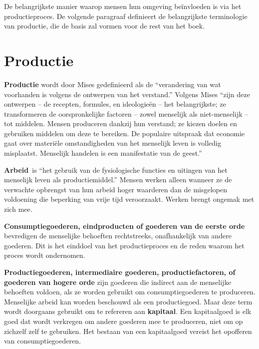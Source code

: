 De belangrijkste manier waarop mensen hun omgeving beïnvloeden is via
het productieproces. De volgende paragraaf definieert de belangrijkste
terminologie van productie, die de basis zal vormen voor de rest van het
boek.

\section{Productie}

\textbf{Productie} wordt door Mises gedefinieerd als de \enquote{verandering van
wat voorhanden is volgens de ontwerpen van het verstand.} Volgens Mises
\enquote{zijn deze ontwerpen -- de recepten, formules, en ideologieën -- het
belangrijkste; ze transformeren de oorspronkelijke factoren -- zowel
menselijk als niet-menselijk -- tot middelen. Mensen produceren dankzij
hun verstand; ze kiezen doelen en gebruiken middelen om deze te
bereiken. De populaire uitspraak dat economie gaat over materiële
omstandigheden van het menselijk leven is volledig misplaatst. Menselijk
handelen is een manifestatie van de geest.}\autocite{39}

\textbf{Arbeid}~is \enquote{het gebruik van de fysiologische functies en
uitingen van het menselijk leven als productiemiddel.}\autocite{40} Mensen werken alleen wanneer ze de verwachte opbrengst van hun arbeid
hoger waarderen dan de misgelopen voldoening die beperking van vrije
tijd veroorzaakt. Werken brengt ongemak met zich mee.

\textbf{Consumptiegoederen, eindproducten of goederen van de eerste
orde} bevredigen de menselijke behoeften rechtstreeks, onafhankelijk van
andere goederen. Dit is het einddoel van het productieproces en de reden
waarom het proces wordt ondernomen.

\textbf{Productiegoederen, intermediaire goederen, productiefactoren, of
goederen van hogere orde} zijn goederen die indirect aan de menselijke
behoeften voldoen, als ze worden gebruikt om consumptiegoederen te
produceren. Menselijke arbeid kan worden beschouwd als een
productiegoed. Maar deze term wordt doorgaans gebruikt om te refereren
aan \textbf{kapitaal}. Een kapitaalgoed is elk goed dat wordt verkregen
om andere goederen mee te produceren, niet om op zichzelf zelf te
gebruiken. Het bestaan van een kapitaalgoed vereist het opofferen van
consumptiegoederen.

